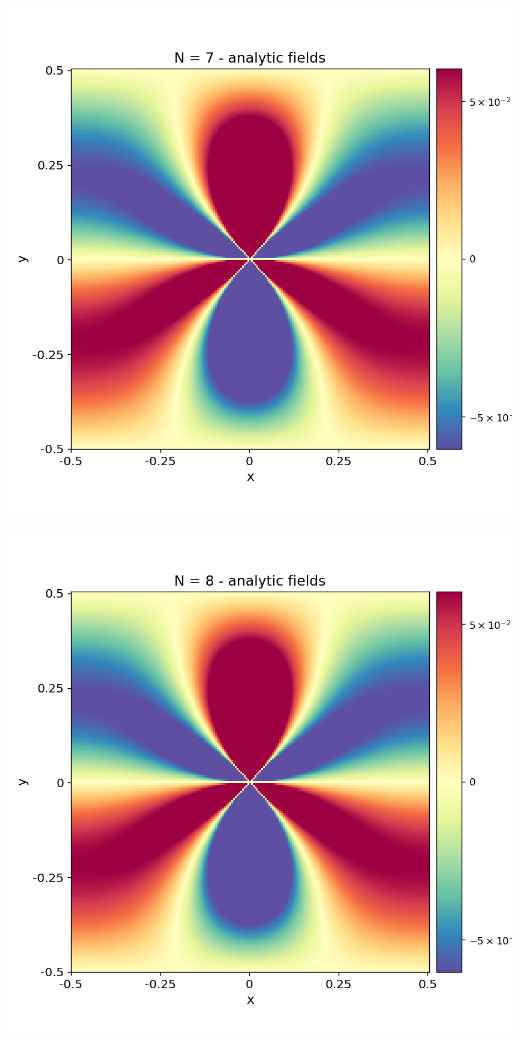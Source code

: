 \documentclass[12pt,a4paper]{article}
\theoremstyle{plain}
\begin{document}
\begin{minipage}{0.24\textwidth}
	\centering
	\includegraphics[width=\textwidth]{../stress_field_07.png}
\end{minipage}	
\begin{minipage}{0.24\textwidth}
	\centering
	\includegraphics[width=\textwidth]{../stress_field_08.png}
\end{minipage}	
\end{document}
